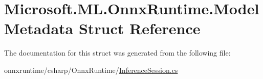 \hypertarget{structMicrosoft_1_1ML_1_1OnnxRuntime_1_1ModelMetadata}{}\section{Microsoft.\+M\+L.\+Onnx\+Runtime.\+Model\+Metadata Struct Reference}
\label{structMicrosoft_1_1ML_1_1OnnxRuntime_1_1ModelMetadata}


The documentation for this struct was generated from the following file\+:\begin{DoxyCompactItemize}
\item 
onnxruntime/csharp/\+Onnx\+Runtime/\mbox{\hyperlink{OnnxRuntime_2InferenceSession_8cs}{Inference\+Session.\+cs}}\end{DoxyCompactItemize}
